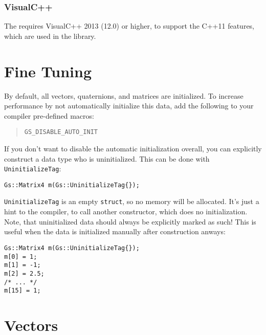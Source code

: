 \documentclass{article}
\begin{document}
\subsubsection*{VisualC++}

The \gausslib requires VisualC++ 2013 (12.0) or higher, to support the C++11 features, which are used in the library.



\section*{Fine Tuning}

By default, all vectors, quaternions, and matrices are initialized. To increase performance by not automatically
initialize this data, add the following to your compiler pre-defined macros:
\begin{quote}
\texttt{GS\_DISABLE\_AUTO\_INIT}
\end{quote}
If you don't want to disable the automatic initialization overall, you can explicitly construct a data type
who is uninitialized. This can be done with \texttt{UninitializeTag}:
\begin{lstlisting}
Gs::Matrix4 m(Gs::UninitializeTag{});
\end{lstlisting}
\texttt{UninitializeTag} is an empty \texttt{struct}, so no memory will be allocated. It's just a hint to the compiler,
to call another constructor, which does no initialization.
Note, that uninitialized data should always be explicitly marked as such!
This is useful when the data is initialized manually after construction anways:
\begin{lstlisting}
Gs::Matrix4 m(Gs::UninitializeTag{});
m[0] = 1;
m[1] = -1;
m[2] = 2.5;
/* ... */
m[15] = 1;
\end{lstlisting}



\newpage

\section*{Vectors}
\end{document}
